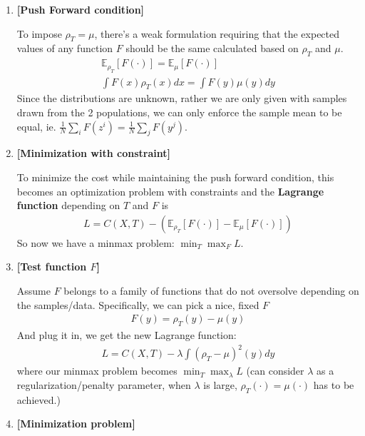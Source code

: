 \documentclass[11pt]{article}
\begin{document}
\begin{enumerate}
    \item {\bf [Push Forward condition]}
    
    To impose $\rho_T=\mu$, there's a weak formulation requiring that the expected values of any function $F$ should be the same calculated based on $\rho_T$ and $\mu$.
    \begin{align*}
        \mathbb{E}_{\rho_{T}} [F(\cdot)] = \mathbb{E}_{\mu} [F(\cdot)]\\
        \int F(x) \rho_T(x) dx = \int F(y) \mu(y) dy
    \end{align*}
    Since the distributions are unknown, rather we are only given with samples drawn from the 2 populations, we can only enforce the sample mean to be equal, ie. $\frac{1}{N} \sum_i F(z^i) = \frac{1}{N} \sum_j F(y^j)$.
    
    \item {\bf [Minimization with constraint]}
    
    To minimize the cost while maintaining the push forward condition, this becomes an optimization problem with constraints and the {\bf Lagrange function} depending on $T$ and $F$ is 
    \begin{align}
        L = C(X,T) - (\mathbb{E}_{\rho_{T}} [F(\cdot)] - \mathbb{E}_{\mu} [F(\cdot)])
    \end{align}
    So now we have a minmax problem: $\min_T \max_F L$.
    
    \item {\bf [Test function $F$]}
    
    Assume $F$ belongs to a family of functions that do not oversolve depending on the samples/data. Specifically, we can pick a nice, fixed $F$
    \begin{align}
        F(y) = \rho_T(y) - \mu(y)
    \end{align}
    And plug it in, we get the new Lagrange function:
    \begin{align*}
        L = C(X,T) - \lambda \int (\rho_T - \mu)^2(y) dy
    \end{align*}
    where our minmax problem becomes $\min_T \max_\lambda L$ (can consider $\lambda$ as a regularization/penalty parameter, when $\lambda$ is large, $\rho_T(\cdot) = \mu(\cdot)$ has to be achieved.)
    
    \item {\bf [Minimization problem]}
    

\end{enumerate}
\end{document}
